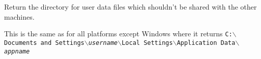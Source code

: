 \label{wxstandardsathsgetuserlocaldatadir}


Return the directory for user data files which shouldn't be shared with
the other machines.

This is the same as  for
all platforms except Windows where it returns 
\texttt{C:$\backslash$Documents and Settings$\backslash$\textit{username}$\backslash$Local Settings$\backslash$Application Data$\backslash$\textit{appname}}



